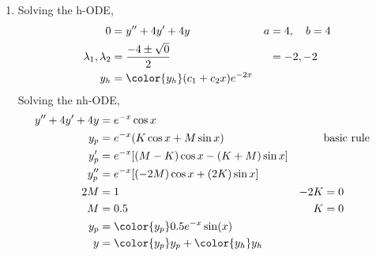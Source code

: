 \begin{enumerate}
    \item Solving the h-ODE,
          \begin{align}
              0                        & = y'' + 4y' + 4y                      & a & = 4, \quad b = 4 \\
              \lambda_{1}, \lambda_{2} & = \frac{-4 \pm \sqrt{0}}{2}           &   & = -2, -2         \\
              y_{h}                    & = \color{y_h} (c_{1} + c_{2}x)e^{-2x}
          \end{align}
          Solving the nh-ODE,
          \begin{align}
              y'' + 4y' + 4y & = e^{-x}\cos x                                                        \\
              y_{p}          & = e^{-x}(K \cos x + M \sin x)               &     & \text{basic rule} \\
              y_{p}'         & = e^{-x}[ (M-K)\cos x - (K+M)\sin x ]                                 \\
              y_{p}''        & = e^{-x}[(-2M)\cos x + (2K)\sin x]                                    \\
              2M             & = 1                                         & -2K & = 0               \\
              M              & = 0.5                                       & K   & = 0               \\
              y_{p}          & = \color{y_p} 0.5e^{-x}\sin(x)                                        \\
              y              & = {\color{y_p} y_{p}} + {\color{y_h} y_{h}}
          \end{align}


\end{enumerate}
